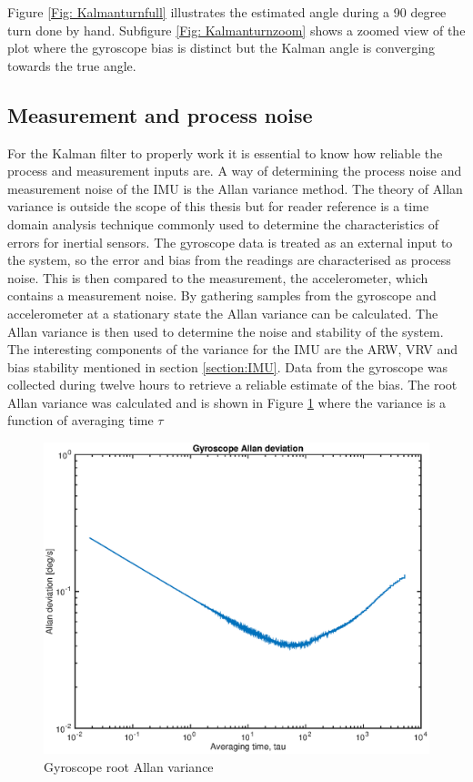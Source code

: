 \documentclass[a4paper,11pt]{kth-mag}
\begin{document}
Figure \ref{Fig: Kalmanturnfull} illustrates the estimated angle during a 90 degree turn done by hand. Subfigure \ref{Fig: Kalmanturnzoom} shows a zoomed view of the plot where the gyroscope bias is distinct but the Kalman angle is converging towards the true angle.



\subsection{Measurement and process noise} \label{chapter:Allan Variance}
For the Kalman filter to properly work it is essential to know how reliable the process and measurement inputs are.  A way of determining the process noise and measurement noise of the IMU is the Allan variance method. The theory of Allan variance is outside the scope of this thesis but for reader reference is a time domain analysis technique commonly used to determine the characteristics of errors for inertial sensors\cite{Allancalibration}.
The gyroscope data is treated as an external input to the system, so the error and bias from the readings are characterised as process noise. This is then compared to the measurement, the accelerometer, which contains a measurement noise.
By gathering samples from the gyroscope and accelerometer at a stationary state the Allan variance can be calculated. The Allan variance is then used to determine the noise and stability of the system. The interesting components of the variance for the IMU are the ARW, VRV and bias stability mentioned in section \ref{section:IMU}.
Data from the gyroscope was collected during twelve hours to retrieve a reliable estimate of the bias. 
The root Allan variance was calculated and is shown in Figure \ref{fig:gyroscope allan} where the variance is a function of averaging time $\tau$

\begin{figure}[!htb]
\centering
\includegraphics[scale=.6]{gyroscopeallan.eps}
\caption{Gyroscope root Allan variance}
\label{fig:gyroscope allan}
\end{figure}
\end{document}
